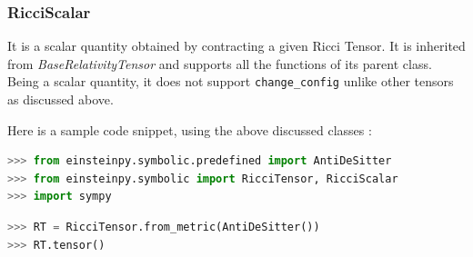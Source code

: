 \documentclass[refree]{aa}
\begin{document}
\subsubsection{RicciScalar}\label{subsubsec:ricciscalar}

It is a scalar quantity obtained by contracting a given Ricci Tensor. It is inherited from \textit{BaseRelativityTensor} and supports all the functions of its parent class. Being a scalar quantity, it does not support \texttt{change\_config} unlike other tensors as discussed above.




Here is a sample code snippet, using the above discussed classes : 

\begin{lstlisting}[language=Python, caption=Importing Anti De-Sitter metric]
>>> from einsteinpy.symbolic.predefined import AntiDeSitter
>>> from einsteinpy.symbolic import RicciTensor, RicciScalar
>>> import sympy
\end{lstlisting}

\begin{lstlisting}[language=Python, caption=Obtaining Ricci Tensor from the metric]
>>> RT = RicciTensor.from_metric(AntiDeSitter())
>>> RT.tensor()
\end{lstlisting}
\end{document}
